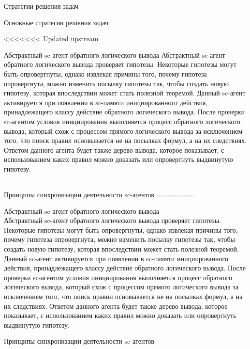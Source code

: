 \begin{frame}{Стратегии решения задач}
\begin{frame}{\large Основные стратегии решения задач}
\begin{textitemize}
<<<<<<< Updated upstream
\begin{frame}{\Large Абстрактный sc-агент обратного логического вывода}
\vspace{8mm}
  Абстрактный sc-агент обратного логического вывода проверяет гипотезы. Некоторые гипотезы могут быть опровергнуты, однако извлекая причины того, почему гипотеза опровергнута, можно изменить посылку гипотезы так, чтобы создать новую гипотезу, которая впоследствии может стать полезной теоремой. Данный sc-агент активируется при появлении в sc-памяти инициированного действия, принадлежащего классу действие обратного логического вывода. После проверки sc-агентом условия инициирования выполняется процесс обратного логического вывода, который схож с процессом прямого логического вывода за исключением того, что поиск правил основывается не на посылках формул, а на их следствиях. Ответом данного агента будет также дерево вывода, которое показывает, с использованием каких правил можно доказать или опровергнуть выдвинутую гипотезу. 
\end{frame}

\begin{frame}{\\Принципы синхронизации деятельности sc-агентов}
=======
\begin{frame}{Абстрактный sc-агент обратного логического вывода}
\topline
\vspace{30
}
 \\

  Абстрактный sc-агент обратного логического вывода проверяет гипотезы. Некоторые гипотезы могут быть опровергнуты, однако извлекая причины того, почему гипотеза опровергнута, можно изменить посылку гипотезы так, чтобы создать новую гипотезу, которая впоследствии может стать полезной теоремой. Данный sc-агент активируется при появлении в sc-памяти инициированного действия, принадлежащего классу действие обратного логического вывода. После проверки sc-агентом условия инициирования выполняется процесс обратного логического вывода, который схож с процессом прямого логического вывода за исключением того, что поиск правил основывается не на посылках формул, а на их следствиях. Ответом данного агента будет также дерево вывода, которое показывает, с использованием каких правил можно доказать или опровергнуть выдвинутую гипотезу. 
\end{frame}

\begin{frame}{Принципы синхронизации деятельности sc-агентов}
\topline
\vspace{30}
 \\
 

\end{frame}
\end{frame}
\end{textitemize}
\end{frame}
\end{frame}
